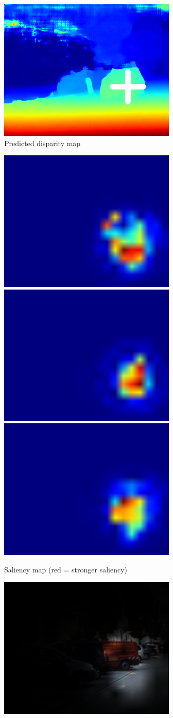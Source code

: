 \begin{figure}[p]
\begin{center}
\begin{subfigure}[t]{\linewidth}
            \includegraphics[width=0.32\linewidth,trim={0 0 0 1cm},clip]{saliency/000074_10_png_disparity.png}
	        \caption{Predicted disparity map}
		\end{subfigure}
    		\begin{subfigure}[t]{\linewidth}
            \centering
            \includegraphics[width=0.32\linewidth,trim={0 0 0 1cm},clip]{saliency/000005_10_png_saliency.png}
            \includegraphics[width=0.32\linewidth,trim={0 0 0 1cm},clip]{saliency/000016_10_png_saliency.png}
            \includegraphics[width=0.32\linewidth,trim={0 0 0 1cm},clip]{saliency/000074_10_png_saliency.png}
	        \caption{Saliency map (red = stronger saliency)}
		\end{subfigure}
    		\begin{subfigure}[t]{\linewidth}
            \centering
            \includegraphics[width=0.32\linewidth,trim={0 0 0 1cm},clip]{saliency/000005_10_png_raw_frame_attenuated2.png}

\end{subfigure}
\end{center}
\end{figure}
